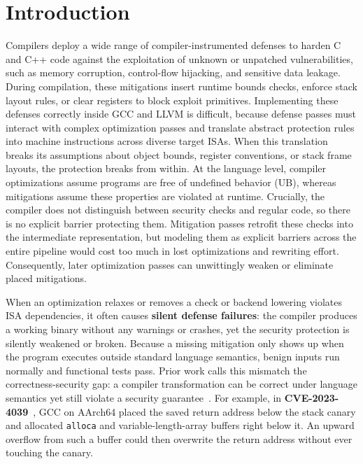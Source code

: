 \documentclass[conference,compsoc]{IEEEtran}
\begin{document}
\section{Introduction}\label{sec:intro}

Compilers deploy a wide range of compiler-instrumented defenses to harden C and C++ code against the exploitation of unknown or unpatched vulnerabilities, such as memory corruption, control-flow hijacking, and sensitive data leakage. During compilation, these mitigations insert runtime bounds checks, enforce stack layout rules, or clear registers to block exploit primitives. Implementing these defenses correctly inside GCC and LLVM is difficult, because defense passes must interact with complex optimization passes and translate abstract protection rules into machine instructions across diverse target ISAs. When this translation breaks its assumptions about object bounds, register conventions, or stack frame layouts, the protection breaks from within. At the language level, compiler optimizations assume programs are free of undefined behavior (UB), whereas mitigations assume these properties are violated at runtime. Crucially, the compiler does not distinguish between security checks and regular code, so there is no explicit barrier protecting them. Mitigation passes retrofit these checks into the intermediate representation, but modeling them as explicit barriers across the entire pipeline would cost too much in lost optimizations and rewriting effort. Consequently, later optimization passes can unwittingly weaken or eliminate placed mitigations.

When an optimization relaxes or removes a check or backend lowering violates ISA dependencies, it often causes \textbf{silent defense failures}: the compiler produces a working binary without any warnings or crashes, yet the security protection is silently weakened or broken. Because a missing mitigation only shows up when the program executes outside standard language semantics, benign inputs run normally and functional tests pass. Prior work calls this mismatch the correctness-security gap: a compiler transformation can be correct under language semantics yet still violate a security guarantee~\cite{dsilva2015correctness}. For example, in \textbf{CVE-2023-4039}~\cite{cve20234039}, GCC on AArch64 placed the saved return address below the stack canary and allocated \texttt{alloca} and variable-length-array buffers right below it. An upward overflow from such a buffer could then overwrite the return address without ever touching the canary.
\end{document}
